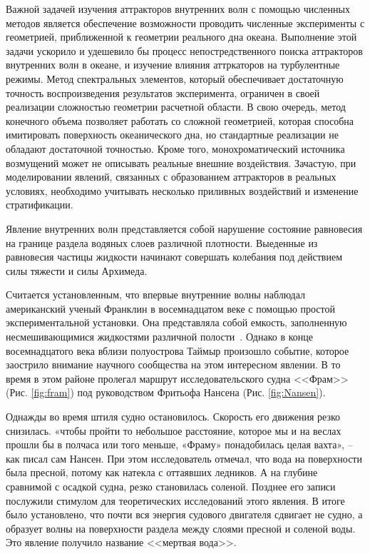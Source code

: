 \Introduction

Важной задачей изучения аттракторов внутренних волн с помощью численных методов является обеспечение возможности проводить численные эксперименты с геометрией, приближенной к геометрии реального дна океана. Выполнение этой задачи ускорило и удешевило бы процесс непостредственного поиска аттракторов внутренних волн в океане, и изучение влияния аттркаторов на турбулентные режимы. Метод спектральных элементов, который обеспечивает достаточную точность воспроизведения результатов эксперимента, ограничен в своей реализации сложностью геометрии расчетной области. В свою очередь, метод конечного объема позволяет работать со сложной геометрией, которая способна имитировать поверхность океанического дна, но стандартные реализации не обладают достаточной точностью. Кроме того, монохроматический источника возмущений может не описывать реальные внешние воздействия. Зачастую, при моделировании явлений, связанных с образованием аттракторов в реальных условиях, необходимо учитывать несколько приливных воздействий \cite{Garrett1972} и изменение стратификации.

Явление внутренних волн представляется собой нарушение состояние равновесия на границе раздела водяных слоев различной плотности. Выеденные из равновесия частицы жидкости начинают совершать колебания под действием силы тяжести и силы Архимеда.

Считается установленным, что впервые внутренние волны наблюдал американский ученый Франклин в восемнадцатом веке с помощью простой экспериментальной установки. Она представляла собой емкость, заполненную несмешивающимися жидкостями различной полости~\cite{Sudolski}. Однако в конце восемнадцатого века вблизи полуострова Таймыр произошло событие, которое заострило внимание научного сообщества на этом интересном явлении. В то время в этом районе пролегал маршрут исследовательского судна <<Фрам>>(Рис. \ref{fig:fram}) под руководством Фритьофа Нансена (Рис. \ref{fig:Nansen}).

Однажды во время штиля судно остановилось. Скорость его движения резко снизилась.  «чтобы пройти то небольшое расстояние, которое мы и на веслах прошли бы в полчаса или того меньше, «Фраму» понадобилась целая вахта», -- как писал сам Нансен. При этом исследователь отмечал, что вода на поверхности была пресной, потому как натекла с оттаявших ледников. А на глубине сравнимой с осадкой судна, резко становилась соленой. Позднее его записи послужили стимулом для теоретических исследований этого явления. В итоге было установлено, что почти вся энергия судового двигателя сдвигает не судно, а образует волны на поверхности раздела между слоями пресной и соленой воды. Это явление получило название <<мертвая вода>>.

